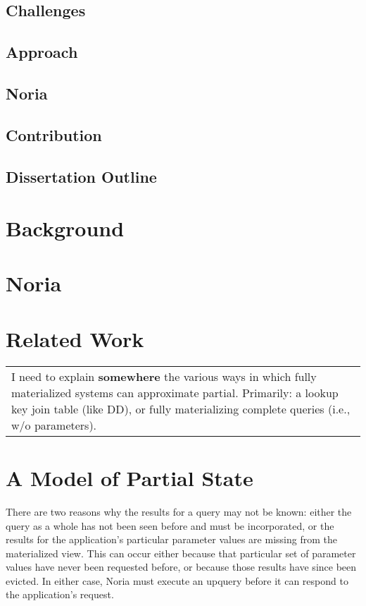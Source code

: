 \documentclass[fontsize=12pt,paper=letter,draft=true]{scrbook}
\newenvironment{inprogress}
  {\color{RedOrange} \begin{tabular}{||p{0.9\textwidth}}}
  {\end{tabular}}
\begin{document}
\section{Challenges}
\section{Approach}
\section{Noria}
\section{Contribution}
\section{Dissertation Outline}

\chapter{Background}

\chapter{Noria}

\chapter{Related Work}

\begin{inprogress}
I need to explain \textbf{somewhere} the various ways in which fully
materialized systems can approximate partial. Primarily: a lookup key join table
(like DD), or fully materializing complete queries (i.e., w/o parameters).
\end{inprogress}

\chapter{A Model of Partial State}

There are two reasons why the results for a query may not be known: either the
query as a whole has not been seen before and must be incorporated, or the
results for the application's particular parameter values are missing from the
materialized view. This can occur either because that particular set of
parameter values have never been requested before, or because those results have
since been evicted. In either case, Noria must execute an upquery before it can
respond to the application's request.
\end{document}
